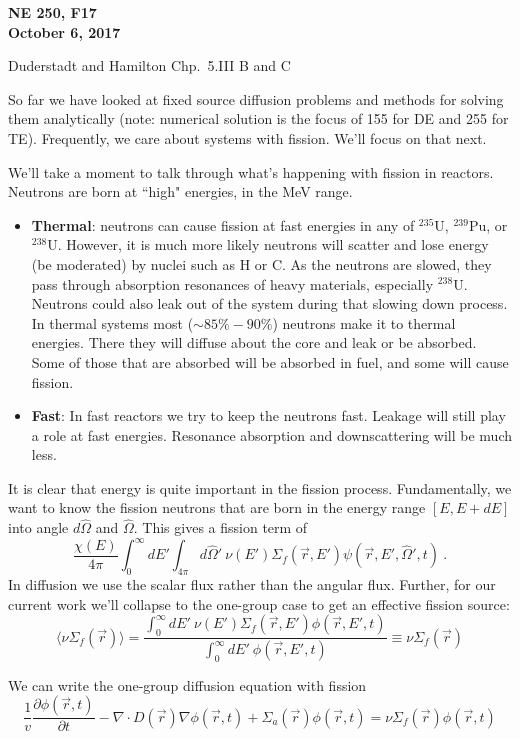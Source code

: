\documentclass[12pt]{article}
\newcommand{\vOmega}{\ensuremath{\hat{\Omega}}}
\begin{document}
\begin{center}
{\bf NE 250, F17\\
October 6, 2017 
}
\end{center}

Duderstadt and Hamilton Chp.\ 5.III B and C

So far we have looked at fixed source diffusion problems and methods for solving them analytically (note: numerical solution is the focus of 155 for DE and 255 for TE). Frequently, we care about systems with fission. We'll focus on that next.

We'll take a moment to talk through what's happening with fission in reactors. Neutrons are born at ``high" energies, in the MeV range. 
\begin{itemize}
\item \textbf{Thermal}: neutrons can cause fission at fast energies in any of $^{235}$U, $^{239}$Pu, or $^{238}$U. However, it is much more likely neutrons will scatter and lose energy (be moderated) by nuclei such as H or C. As the neutrons are slowed, they pass through absorption resonances of heavy  materials, especially $^{238}$U. Neutrons could also leak out of the system during that slowing down process. In thermal systems most ($\sim 85\%-90\%$) neutrons make it to thermal energies. There they will diffuse about the core and leak or be absorbed. Some of those that are absorbed will be absorbed in fuel, and some will cause fission.

\item \textbf{Fast}: In fast reactors we try to keep the neutrons fast. Leakage will still play a role at fast energies. Resonance absorption and downscattering will be much less. 
\end{itemize}
%
It is clear that energy is quite important in the fission process. Fundamentally, we want to know the fission neutrons that are born in the energy range $[E, E+dE]$ into angle $d\vOmega$ and $\vOmega$. This gives a fission term of 
\[
\frac{\chi(E)}{4\pi} \int_0^{\infty} dE' \int_{4\pi} d\vOmega' \: \nu(E') \Sigma_f(\vec{r}, E') \psi(\vec{r}, E', \vOmega', t) \:.  
\] 
In diffusion we use the scalar flux rather than the angular flux. Further, for our current work we'll collapse to the one-group case to get an effective fission source:
\[
\langle \nu \Sigma_f (\vec{r}) \rangle = \frac{\int_0^{\infty} dE'\: \nu(E') \Sigma_f(\vec{r}, E') \phi(\vec{r}, E', t)} {\int_0^{\infty} dE'\: \phi(\vec{r}, E', t)} \equiv \nu \Sigma_f (\vec{r}) 
\]

We can write the one-group diffusion equation with fission
\begin{equation}
\frac{1}{v} \frac{\partial \phi(\vec{r}, t)}{\partial t} - \nabla \cdot D(\vec{r}) \nabla	\phi(\vec{r}, t) + \Sigma_a(\vec{r}) \phi(\vec{r}, t) = \nu\Sigma_f (\vec{r})\phi(\vec{r}, t)
\end{equation}
\end{document}

